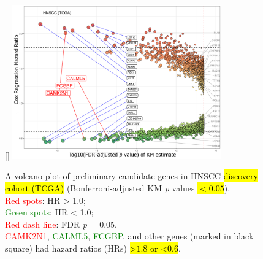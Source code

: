 \documentclass[
paper=landscape,
paper=160mm:90mm, %
fontsize=11pt, %
pagesize, %
parskip=half-, %
]{scrartcl} %
\theoremstyle{mythmstyle} %
\begin{document}
\begin{figure}[ht]

[\FBwidth]
{    \includegraphics[width=9cm]{Rplot_TCGA_HNSCC_CoxHR_CAMK2N1_top3FDRKM.pdf}}
{\captionsetup{labelformat=empty}    
\caption{A volcano plot of preliminary candidate genes in HNSCC \hl{discovery cohort (TCGA)} {\tiny (Bonferroni-adjusted KM \textit{p} values \hl{$< 0.05$})}.\\
{\tiny    \textcolor{red}{Red spots}: HR > 1.0;\\
    \textcolor{green}{Green spots}: HR < 1.0;\\
    \textcolor{red}{Red dash line}: FDR \textit{p} = 0.05.}\\
    \textcolor{red}{CAMK2N1}, \textcolor{green}{CALML5}, \textcolor{green}{FCGBP}, and  other genes (marked in \textcolor{black}{black square}) had hazard ratios (HRs) \hl{>$1.8$ or <$0.6$}.
    }}
\end{figure}
\end{document}
